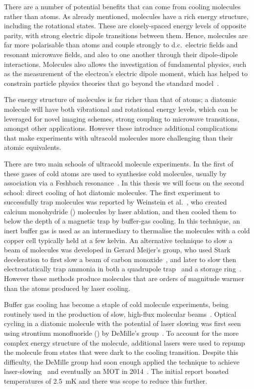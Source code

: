 There are a number of potential benefits that can come from cooling molecules
rather than atoms. As already mentioned, molecules have a rich energy
structure, including the rotational states. These are closely-spaced energy
levels of opposite parity, with strong electric dipole transitions between
them. Hence, molecules are far more polarisable than atoms and couple strongly
to d.c.\ electric fields and resonant microwave fields, and also to one another
through their dipole-dipole interactions.
%
Molecules also allows the investigation of fundamental physics, such as the
measurement of the electron's electric dipole moment, which has helped to
constrain particle physics theories that go beyond the standard
model~\cite{ACMEreview}.

The energy structure of molecules is far richer than that of atoms; a diatomic
molecule will have both vibrational and rotational energy levels, which can be
leveraged for novel imaging schemes, strong coupling to microwave transitions,
amongst other applications. However these introduce additional complications
that make experiments with ultracold molecules more challenging than their
atomic equivalents.

There are two main schools of ultracold molecule experiments. In the first of
these gases of cold atoms are used to synthesise cold molecules, usually by
association via a Feshbach resonance~\cite{PhysRevA.89.033604}.  In this thesis
we will focus on the second school: direct cooling of hot diatomic molecules.
The first experiment to successfully trap molecules was reported by Weinstein
et al.~\cite{Weinstein1998}, who created calcium monohydride (\CaH{}) molecules
by laser ablation, and then cooled them to below the depth of a magnetic trap
by buffer-gas cooling. In this technique, an inert buffer gas is used as an
intermediary to thermalise the molecules with a cold copper cell typically held
at a few kelvin.
%
An alternative technique to slow a beam of molecules was developed in Gerard
Meijer's group, who used Stark deceleration to first slow a beam of carbon
monoxide~\cite{Bethlem1999}, and later to slow then electrostatically trap
ammonia in both a quadrupole trap~\cite{Bethlem2000} and a storage
ring~\cite{Crompvoets2001, Crompvoets2005}. However these methods produce
molecules that are orders of magnitude warmer than the atoms produced by laser
cooling.


Buffer gas cooling has become a staple of cold molecule experiments, being
routinely used in the production of slow, high-flux molecular
beams~\cite{Maxwell2005, Patterson2007, Barry2011}.  Optical cycling in a
diatomic molecule with the potential of laser slowing was first seen using
strontium monofluoride (\SrF{}) by DeMille's group~\cite{Shuman2009}. To
account for the more complex energy structure of the molecule, additional
lasers were used to repump the molecule from states that were dark to the
cooling transition.  Despite this difficulty, the DeMille group had soon enough
applied the technique to achieve laser-slowing~\cite{PhysRevLett.108.103002}
and eventually an \SrF{} MOT in 2014~\cite{Barry2014, PhysRevLett.116.063004}.
The initial report boasted temperatures of \SI{2.5}{\milli\kelvin} and
there was scope to reduce this further.

